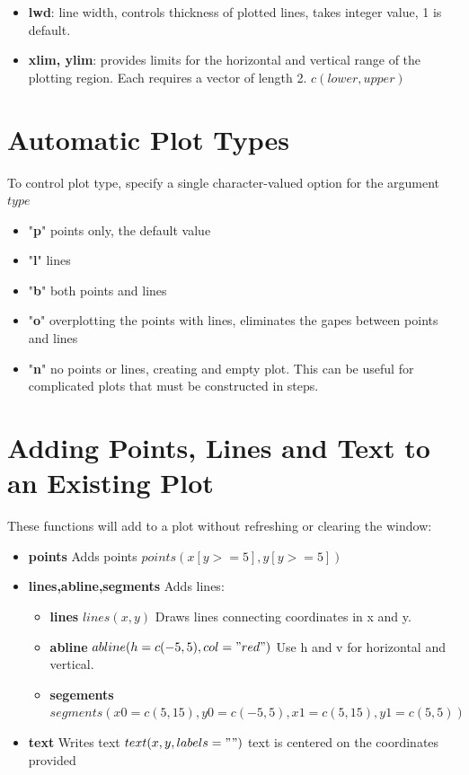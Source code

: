 \documentclass[openany]{book}
\begin{document}
\begin{flushleft}
\begin{itemize}
\item \textbf{lwd}: line width, controls thickness of plotted lines, takes integer value, 1 is default.

\item \textbf{xlim, ylim}: provides limits for the horizontal and vertical range of the plotting region. Each requires a vector of length 2. $c(lower,upper)$

\end{itemize}
\section{Automatic Plot Types}
To control plot type, specify a single character-valued option for the argument $type$ \medbreak
\begin{itemize}
\item "\textbf{p}" points only, the default value
\item "\textbf{l}" lines
\item "\textbf{b}" both points and lines
\item "\textbf{o}" overplotting the points with lines, eliminates the gapes between points and lines
\item "\textbf{n}" no points or lines, creating and empty plot. This can be useful for complicated plots that must be constructed in steps.
\end{itemize}
\section{Adding Points, Lines and Text to an Existing Plot}
These functions will add to a plot without refreshing or clearing the window:
\begin{itemize}
\item \textbf{points} Adds points  $points(x[y>=5],y[y>=5])$

\item \textbf{lines,abline,segments} Adds lines:
\begin{itemize}
\item \textbf{lines} $lines(x,y)$ Draws lines connecting coordinates in x and y.
\item \textbf{abline} $abline(h=c(-5,5),col="red")$  Use h and v for horizontal and vertical.
\item \textbf{segements} $segments(x0=c(5,15),y0=c(-5,5),x1=c(5,15),y1=c(5,5))$
\end{itemize}

\item \textbf{text} Writes text $text(x,y,labels="")$ text is centered on the coordinates provided


\end{itemize}
\end{flushleft}
\end{document}
